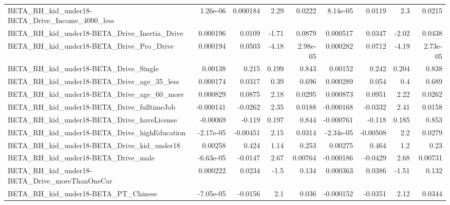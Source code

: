\begin{tabular}{lrrrrrrrr}
BETA\_RH\_kid\_under18-BETA\_Drive\_Income\_4000\_less    &    1.26e-06 &     0.000184 &     2.29 &   0.0222 &   8.14e-05 &      0.0119 &          2.3 &        0.0215 \\
BETA\_RH\_kid\_under18-BETA\_Drive\_Inertia\_Drive       &    0.000196 &       0.0109 &    -1.71 &   0.0879 &   0.000517 &      0.0347 &        -2.02 &        0.0438 \\
BETA\_RH\_kid\_under18-BETA\_Drive\_Pro\_Drive           &    0.000194 &       0.0503 &    -4.18 & 2.98e-05 &   0.000282 &      0.0712 &        -4.19 &      2.73e-05 \\
BETA\_RH\_kid\_under18-BETA\_Drive\_Single              &     0.00138 &        0.215 &    0.199 &    0.843 &    0.00152 &       0.242 &        0.204 &         0.838 \\
BETA\_RH\_kid\_under18-BETA\_Drive\_age\_35\_less         &    0.000174 &       0.0317 &     0.39 &    0.696 &   0.000289 &       0.054 &          0.4 &         0.689 \\
BETA\_RH\_kid\_under18-BETA\_Drive\_age\_60\_more         &    0.000829 &       0.0875 &     2.18 &   0.0295 &   0.000873 &      0.0951 &         2.22 &        0.0262 \\
BETA\_RH\_kid\_under18-BETA\_Drive\_fulltimeJob         &   -0.000141 &      -0.0262 &     2.35 &   0.0188 &  -0.000168 &     -0.0332 &         2.41 &        0.0158 \\
BETA\_RH\_kid\_under18-BETA\_Drive\_haveLicense         &    -0.00069 &       -0.119 &    0.197 &    0.844 &  -0.000761 &      -0.118 &        0.185 &         0.853 \\
BETA\_RH\_kid\_under18-BETA\_Drive\_highEducation       &   -2.17e-05 &     -0.00451 &     2.15 &   0.0314 &  -2.34e-05 &    -0.00508 &          2.2 &        0.0279 \\
BETA\_RH\_kid\_under18-BETA\_Drive\_kid\_under18         &     0.00258 &        0.424 &     1.14 &    0.253 &    0.00275 &       0.464 &          1.2 &          0.23 \\
BETA\_RH\_kid\_under18-BETA\_Drive\_male                &   -6.63e-05 &      -0.0147 &     2.67 &  0.00764 &  -0.000186 &     -0.0429 &         2.68 &       0.00731 \\
BETA\_RH\_kid\_under18-BETA\_Drive\_moreThanOneCar      &    0.000222 &       0.0234 &     -1.5 &    0.134 &   0.000363 &      0.0386 &        -1.51 &         0.132 \\
BETA\_RH\_kid\_under18-BETA\_PT\_Chinese                &   -7.05e-05 &      -0.0156 &      2.1 &    0.036 &  -0.000152 &     -0.0351 &         2.12 &        0.0344 \\

\end{tabular}
